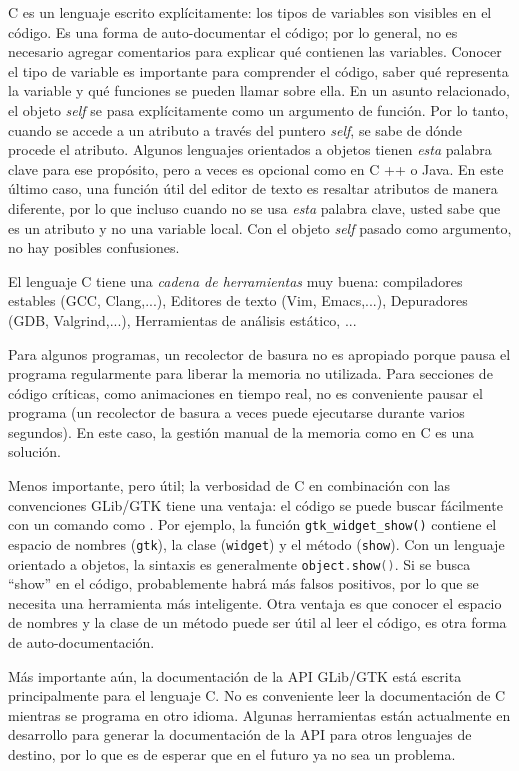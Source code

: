 C es un lenguaje escrito explícitamente: los tipos de variables son visibles en el código. Es una forma de auto-documentar el código; por lo general, no es necesario agregar comentarios para explicar qué contienen las variables. Conocer el tipo de variable es importante para comprender el código, saber qué representa la variable y qué funciones se pueden llamar sobre ella. En un asunto relacionado, el objeto \emph{self} se pasa explícitamente como un argumento de función. Por lo tanto, cuando se accede a un atributo a través del puntero \emph{self}, se sabe de dónde procede el atributo. Algunos lenguajes orientados a objetos tienen \emph{esta} palabra clave para ese propósito, pero a veces es opcional como en C ++ o Java. En este último caso, una función útil del editor de texto es resaltar atributos de manera diferente, por lo que incluso cuando no se usa \emph{esta} palabra clave, usted sabe que es un atributo y no una variable local. Con el objeto \emph{self} pasado como argumento, no hay posibles confusiones.

El lenguaje C tiene una \emph{cadena de herramientas} muy buena: compiladores estables (GCC, Clang,...), Editores de texto (Vim, Emacs,...), Depuradores (GDB, Valgrind,...), Herramientas de análisis estático, ...

Para algunos programas, un recolector de basura no es apropiado porque pausa el programa regularmente para liberar la memoria no utilizada. Para secciones de código críticas, como animaciones en tiempo real, no es conveniente pausar el programa (un recolector de basura a veces puede ejecutarse durante varios segundos). En este caso, la gestión manual de la memoria como en C es una solución.

Menos importante, pero útil; la verbosidad de C en combinación con las convenciones GLib/GTK tiene una ventaja: el código se puede buscar fácilmente con un comando como . Por ejemplo, la función \lstinline{gtk_widget_show()} contiene el espacio de nombres (\lstinline{gtk}), la clase (\lstinline{widget}) y el método (\lstinline{show}). Con un lenguaje orientado a objetos, la sintaxis es generalmente \lstinline[language=C++]{object.show()}. Si se busca ``show'' en el código, probablemente habrá más falsos positivos, por lo que se necesita una herramienta más inteligente. Otra ventaja es que conocer el espacio de nombres y la clase de un método puede ser útil al leer el código, es otra forma de auto-documentación.


Más importante aún, la documentación de la API GLib/GTK está escrita principalmente para el lenguaje C. No es conveniente leer la documentación de C mientras se programa en otro idioma. Algunas herramientas están actualmente en desarrollo para generar la documentación de la API para otros lenguajes de destino, por lo que es de esperar que en el futuro ya no sea un problema.

